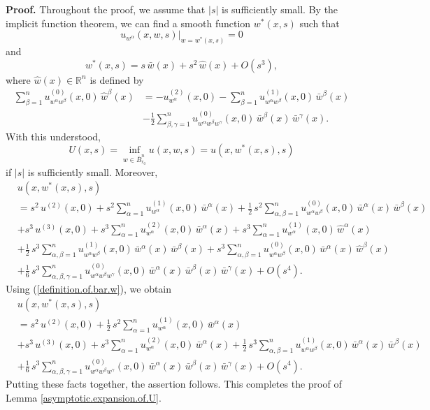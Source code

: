 \documentclass[11pt]{amsart}
\theoremstyle{definition}
\begin{document}
\textbf{Proof.}
Throughout the proof, we assume that $|s|$ is sufficiently small. By the implicit function theorem, we can find a smooth function $w^*(x,s)$ such that 
\[u_{w^\alpha}(x,w,s) \big |_{w=w^*(x,s)} = 0\] 
and 
\[w^*(x,s) = s \, \bar{w}(x) + s^2 \, \hat{w}(x) + O(s^3),\] 
where $\hat{w}(x) \in \mathbb{R}^n$ is defined by 
\begin{align*} 
\sum_{\beta=1}^n u^{(0)}_{w^\alpha w^\beta}(x,0) \, \hat{w}^\beta(x) 
&= -u^{(2)}_{w^\alpha}(x,0) - \sum_{\beta=1}^n u^{(1)}_{w^\alpha w^\beta}(x,0) \, \bar{w}^\beta(x) \\ 
&- \frac{1}{2} \sum_{\beta,\gamma=1}^n u^{(0)}_{w^\alpha w^\beta w^\gamma}(x,0) \, \bar{w}^\beta(x) \, \bar{w}^\gamma(x). 
\end{align*} 
With this understood, 
\[U(x,s) = \inf_{w \in \bar{B}_{r_0}^n} u(x,w,s) = u(x,w^*(x,s),s)\] 
if $|s|$ is sufficiently small. Moreover, 
\begin{align*} 
&u(x,w^*(x,s),s) \\ 
&= s^2 \, u^{(2)}(x,0) + s^2 \sum_{\alpha=1}^n u^{(1)}_{w^\alpha}(x,0) \, \bar{w}^\alpha(x) + \frac{1}{2} \, s^2 \sum_{\alpha,\beta=1}^n u^{(0)}_{w^\alpha w^\beta}(x,0) \, \bar{w}^\alpha(x) \, \bar{w}^\beta(x) \\ 
&+ s^3 \, u^{(3)}(x,0) + s^3 \sum_{\alpha=1}^n u^{(2)}_{w^\alpha}(x,0) \, \bar{w}^\alpha(x) + s^3 \sum_{\alpha=1}^n u^{(1)}_{w^\alpha}(x,0) \, \hat{w}^\alpha(x) \\ 
&+ \frac{1}{2} \, s^3 \sum_{\alpha,\beta=1}^n u^{(1)}_{w^\alpha w^\beta}(x,0) \, \bar{w}^\alpha(x) \, \bar{w}^\beta(x) + s^3 \sum_{\alpha,\beta=1}^n u^{(0)}_{w^\alpha w^\beta}(x,0) \, \bar{w}^\alpha(x) \, \hat{w}^\beta(x) \\ 
&+ \frac{1}{6} \, s^3 \sum_{\alpha,\beta,\gamma=1}^n u^{(0)}_{w^\alpha w^\beta w^\gamma}(x,0) \, \bar{w}^\alpha(x) \, \bar{w}^\beta(x) \, \bar{w}^\gamma(x) + O(s^4). 
\end{align*}
Using (\ref{definition.of.bar.w}), we obtain 
\begin{align*} 
&u(x,w^*(x,s),s) \\ 
&= s^2 \, u^{(2)}(x,0) + \frac{1}{2} \, s^2 \sum_{\alpha=1}^n u^{(1)}_{w^\alpha}(x,0) \, \bar{w}^\alpha(x) \\ 
&+ s^3 \, u^{(3)}(x,0) + s^3 \sum_{\alpha=1}^n u^{(2)}_{w^\alpha}(x,0) \, \bar{w}^\alpha(x) + \frac{1}{2} \, s^3 \sum_{\alpha,\beta=1}^n u^{(1)}_{w^\alpha w^\beta}(x,0) \, \bar{w}^\alpha(x) \, \bar{w}^\beta(x) \\ 
&+ \frac{1}{6} \, s^3 \sum_{\alpha,\beta,\gamma=1}^n u^{(0)}_{w^\alpha w^\beta w^\gamma}(x,0) \, \bar{w}^\alpha(x) \, \bar{w}^\beta(x) \, \bar{w}^\gamma(x) + O(s^4). 
\end{align*}
Putting these facts together, the assertion follows. This completes the proof of Lemma \ref{asymptotic.expansion.of.U}. \\
\end{document}
